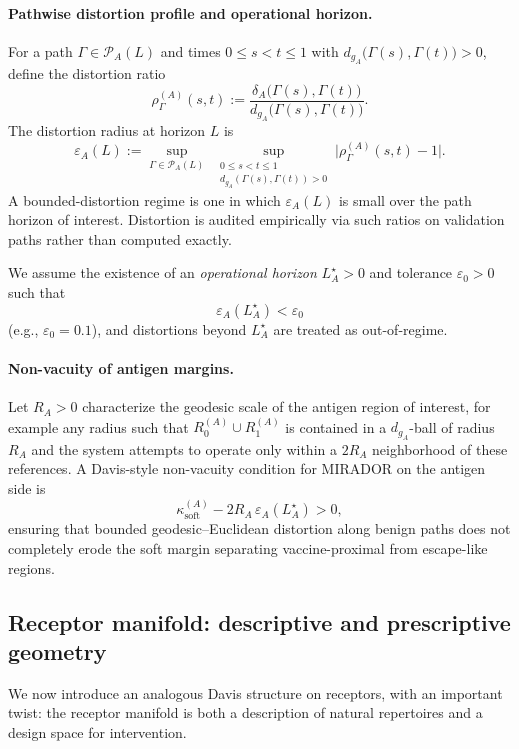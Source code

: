 \documentclass[11pt]{article}
\newcommand{\Pcal}{\mathcal{P}}
\begin{document}
\paragraph{Pathwise distortion profile and operational horizon.}
For a path $\Gamma \in \Pcal_A(L)$ and times $0 \le s < t \le 1$ with $d_{g_A}\bigl(\Gamma(s),\Gamma(t)\bigr) > 0$, define the distortion ratio
\[
  \rho^{(A)}_\Gamma(s,t)
  := \frac{\delta_A\bigl(\Gamma(s),\Gamma(t)\bigr)}{d_{g_A}\bigl(\Gamma(s),\Gamma(t)\bigr)}.
\]
The distortion radius at horizon $L$ is
\[
  \varepsilon_A(L)
  := \sup_{\Gamma \in \Pcal_A(L)}
     \;\sup_{\substack{0 \le s < t \le 1\\ d_{g_A}(\Gamma(s),\Gamma(t))>0}}
     \bigl| \rho^{(A)}_\Gamma(s,t) - 1 \bigr|.
\]
A bounded-distortion regime is one in which $\varepsilon_A(L)$ is small over the path horizon of interest. Distortion is audited empirically via such ratios on validation paths rather than computed exactly.

We assume the existence of an \emph{operational horizon} $L_A^\star > 0$ and tolerance $\varepsilon_0 > 0$ such that
\[
  \varepsilon_A(L_A^\star) < \varepsilon_0
\]
(e.g., $\varepsilon_0 = 0.1$), and distortions beyond $L_A^\star$ are treated as out-of-regime.

\paragraph{Non-vacuity of antigen margins.}
Let $R_A > 0$ characterize the geodesic scale of the antigen region of interest, for example any radius such that $R^{(A)}_0 \cup R^{(A)}_1$ is contained in a $d_{g_A}$-ball of radius $R_A$ and the system attempts to operate only within a $2R_A$ neighborhood of these references. A Davis-style non-vacuity condition for MIRADOR on the antigen side is
\begin{equation}
  \kappa^{(A)}_{\mathrm{soft}} - 2 R_A \,\varepsilon_A(L_A^\star) > 0,
  \label{eq:antigen-nonvacuity}
\end{equation}
ensuring that bounded geodesic--Euclidean distortion along benign paths does not completely erode the soft margin separating vaccine-proximal from escape-like regions.

\subsection{Receptor manifold: descriptive and prescriptive geometry}
\label{sec:receptor-manifold}

We now introduce an analogous Davis structure on receptors, with an important twist: the receptor manifold is both a description of natural repertoires and a design space for intervention.
\end{document}
